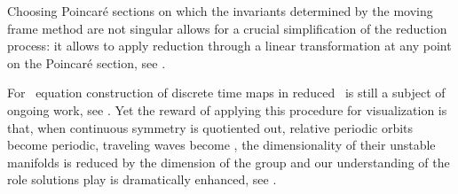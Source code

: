 Choosing Poincar\'e sections on which the invariants
determined by the moving frame method are not singular allows for a crucial simplification of the reduction
process: it allows to apply reduction through a linear transformation at any point on the Poincar\'e section,
see .

For \KS\ equation construction of discrete time maps in reduced \statesp\ is still a subject of ongoing
work, see . Yet the reward of applying this procedure for visualization
is that, when continuous symmetry is quotiented out, relative periodic
orbits become periodic, traveling waves become \eqva, the dimensionality of their unstable manifolds
is reduced by the dimension of the group and our understanding of the role solutions play is dramatically
enhanced, see .
